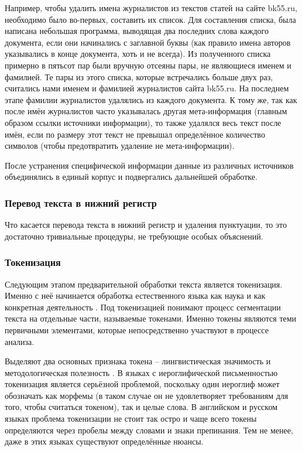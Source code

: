 Например, чтобы удалить имена журналистов из текстов статей на сайте bk55.ru, необходимо было во-первых, составить их список. Для составления списка, была написана небольшая программа, выводящая два последних слова каждого документа, если они начинались с заглавной буквы (как правило имена авторов указывались в конце документа, хоть и не всегда). Из полученного списка примерно в пятьсот пар были вручную отсеяны пары, не являющиеся именем и фамилией. Те пары из этого списка, которые встречались больше двух раз, считались нами именем и фамилией журналистов сайта bk55.ru. На последнем этапе фамилии журналистов удалялись из каждого документа. К тому же, так как после имён журналистов часто указывалась другая мета-информация (главным образом ссылки источники информации), то также удалялся весь текст после имён, если по размеру этот текст не превышал определённое количество символов (чтобы предотвратить удаление не мета-информации). 

После устранения специфической информации данные из различных источников объединялись в единый корпус и подвергались дальнейшей обработке.

\subsubsection{Перевод текста в нижний регистр}
Что касается перевода текста в нижний регистр и удаления пунктуации, то это достаточно тривиальные процедуры, не требующие особых объяснений.

\subsubsection{Токенизация}
Следующим этапом предварительной обработки текста является токенизация. Именно с неё начинается обработка естественного языка как наука и как конкретная деятельность \cite{Webster1992}. Под токенизацией понимают процесс сегментации текста на отдельные части, называемые токенами. Именно токены являются теми первичными элементами, которые непосредственно участвуют в процессе анализа. 

Выделяют два основных признака токена -- лингвистическая значимость и методологическая полезность \cite[стр. 1106]{Webster1992}. В языках с иероглифической письменностью токенизация является серьёзной проблемой, поскольку один иероглиф может обозначать как морфемы (в таком случае он не удовлетворяет требованиям для того, чтобы считаться токеном), так и целые слова. В английском и русском языках проблема токенизации не стоит так остро и чаще всего токены определяются через пробелы между словами и знаки препинания. Тем не менее, даже в этих языках существуют определённые нюансы.

